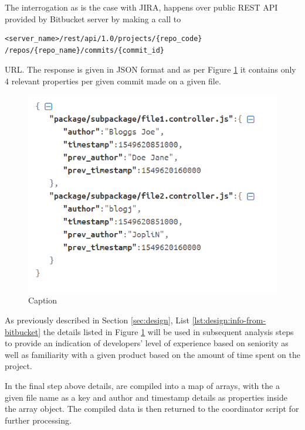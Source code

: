 The interrogation as is the case with JIRA, happens over public REST API provided by Bitbucket server by making a call to 
\begin{verbatim}
<server_name>/rest/api/1.0/projects/{repo_code} /repos/{repo_name}/commits/{commit_id}
\end{verbatim} 
URL.
The response is given in JSON format and as per Figure \ref{fig:source-code:bitbucket-prev-commit-response} it contains only 4 relevant properties per given commit made on a given file.

\begin{figure}[!h]
    \centering
    \includegraphics[scale=0.7]{Figures/gatherer/bitbucket_commit_details.PNG}
    \caption{Caption}
    \label{fig:source-code:bitbucket-prev-commit-response}
\end{figure}

As previously described in Section \ref{sec:design}, List \ref{lst:design:info-from-bitbucket} the details listed in Figure \ref{fig:source-code:bitbucket-prev-commit-response} will be used in subsequent analysis steps to provide an indication of developers' level of experience based on seniority as well as familiarity with a given product based on the amount of time spent on the project.
    
In the final step above details, are compiled into a map of arrays, with the a given file name as a key and author and timestamp details as properties inside the array object. The compiled data is then returned to the coordinator script for further processing.

